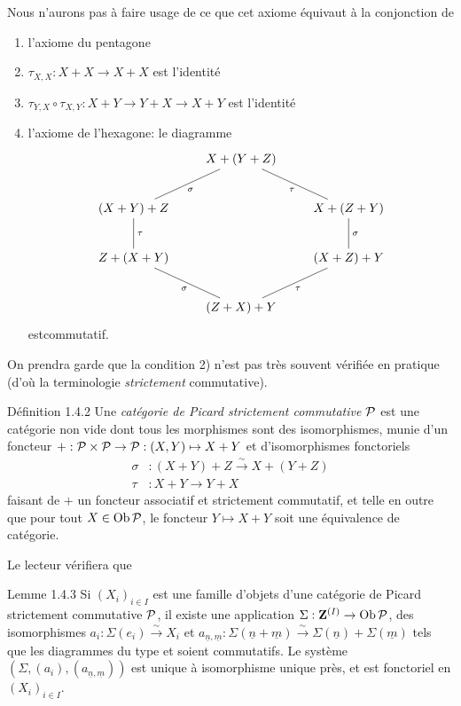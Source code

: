 \documentclass[10pt]{../fichiers-configuration-latex/smfart}
\begin{document}
Nous n'aurons pas à faire usage de ce que cet axiome équivaut à la
conjonction de
\begin{enumerate}
\renewcommand{\labelenumi}{\theenumi)}
\item l'axiome du pentagone

\item $\tau_{X,X}:X+X\rightarrow X+X$ est l'identité

\item $\tau_{Y,X}\circ\tau_{X,Y}:X+Y\rightarrow Y+X\rightarrow X+Y$
est l'identité

\item l'axiome de l'hexagone: le diagramme
$$
\xymatrix{
          &     X + (Y + Z)                 &\\
 (X+Y)+Z  \ar@{-}[ru]_{\sigma} \ar@{-}[d]^{\tau}& & X+(Z+Y)\ar@{-}[lu]^{\tau}\\
Z+(X+Y) \ar@{-}[rd]_{\sigma}  &  & (X+Z) + Y \ar@{-}[u]_{\sigma}\\
          &    (Z+X)+Y    \ar@{-}[ru]_{\tau}                  &
}
$$
est\pageoriginale commutatif.
\end{enumerate}

On prendra garde que la condition 2) n'est pas très souvent vérifiée
en pratique (d'où la terminologie \emph{strictement} commutative).

\begin{enonce*}{Définition 1.4.2}
Une \emph{catégorie de Picard strictement commutative ${\mathcal P}$}
est une catégorie non vide dont tous les morphismes sont des
isomorphismes, munie d'un foncteur $+:{\mathcal P}\times
{\mathcal P}\rightarrow {\mathcal P}:(X,Y)\mapsto X+Y$ et
d'isomorphismes fonctoriels
\begin{align*}
\sigma &: (X+Y)+Z\xrightarrow{\sim} X+(Y+Z)\\
\tau &: X+Y\longrightarrow Y+X
\end{align*}
faisant de $+$ un foncteur associatif et strictement commutatif, et
telle en outre que pour tout $X\in \operatorname{Ob} {\mathcal P}$, le foncteur
$Y\mapsto X+Y$ soit une équivalence de catégorie.
\end{enonce*}

Le lecteur vérifiera que

\begin{enonce*}{Lemme 1.4.3}
Si $(X_{i})_{i\in I}$ est une famille d'objets d'une catégorie de
Picard strictement commutative ${\mathcal P}$, il existe une application
$\Sigma:\mathbf{Z}^{(I)}\rightarrow \operatorname{Ob} {\mathcal P}$, des isomorphismes
$a_{i}:\Sigma(e_{i})\xrightarrow{\sim} X_{i}$ et
$a_{\underline{n},\underline{m}}:\Sigma(\underline{n}+\underline{m})
\xrightarrow{\sim}\Sigma(\underline{n})+\Sigma(\underline{m})$
tels que les diagrammes du type  et 
soient commutatifs. Le système
$(\Sigma,(a_{i}),(a_{\underline{n},\underline{m}}))$ est unique à isomorphisme
unique près, et est fonctoriel en $(X_{i})_{i\in I}$.
\end{enonce*}
\end{document}
